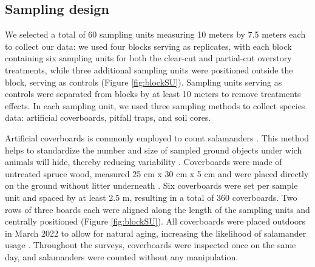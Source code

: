 \subsection*{Sampling design}
\label{subsec:sampling}


We selected a total of 60 sampling units measuring 10 meters by 7.5 meters each to collect our data: we used four blocks serving as replicates, 
with each block containing six sampling units for both the clear-cut and partial-cut overstory treatments, 
while three additional sampling units were positioned outside the block, serving as controls (Figure \ref*{fig:blockSU}).
Sampling units serving as controls were separated from blocks by at least 10 meters to remove treatments effects.
In each sampling unit, we used three sampling methods to collect species data: artificial coverboards, pitfall traps, and soil cores. 

Artificial coverboards is commonly employed to count salamanders \citep{hesedUncoveringSalamanderEcology2012,mazerolleWoodlandSalamanderPopulation2021a,mooreComparisonPopulationEastern2009c}. 
This method helps to standardize the number and size of sampled ground objects under wich animals will hide, thereby reducing variability \citep{hydeSamplingPlethodontidSalamanders2001}. 
Coverboards were made of untreated spruce wood, measured 25 cm x 30 cm x 5 cm and were placed directly on the ground without litter underneath \citep{mazerolleWoodlandSalamanderPopulation2021a}. 
Six coverboards were set per sample unit and spaced by at least 2.5 m, resulting in a total of 360 coverboards.
Two rows of three boards each were aligned along the length of the sampling units and centrally positioned (Figure \ref{fig:blockSU}).
All coverboards were placed outdoors in March 2022 to allow for natural aging, increasing the likelihood of salamander usage \citep{hedrickEffectsCoverboardAge2021,smithEffectsCoverBoard2014a}.
Throughout the surveys, coverboards were inspected once on the same day, and salamanders were counted without any manipulation.


